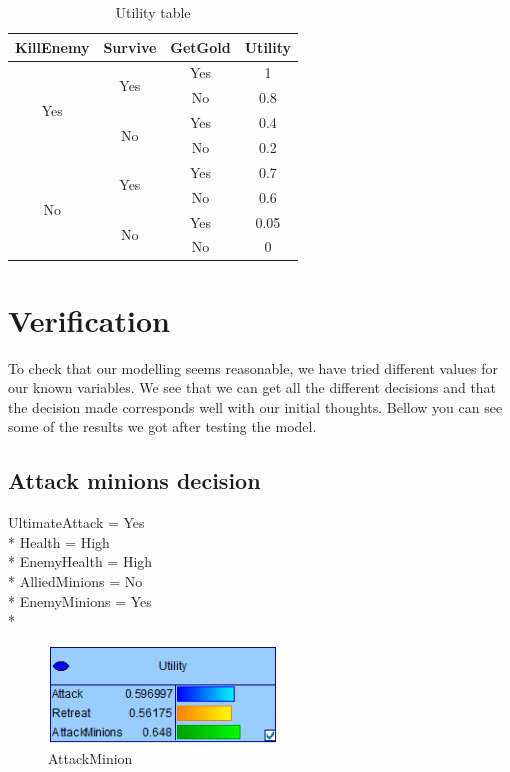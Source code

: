 \documentclass[titlepage]{article}
\begin{document}
\begin{table}[H]
\centering
\begin{tabular}{ |c|c|c|c| }

\hline
KillEnemy & Survive & GetGold & Utility \\ \hline
\multirow{4}{*}{Yes} & \multirow{2}{*}{Yes} & Yes & 1 \\ \cline{3-4}
 & & No & 0.8 \\ \cline{2-4}
 & \multirow{2}{*}{No} & Yes & 0.4 \\ \cline{3-4}
 & & No & 0.2 \\ \hline

 \multirow{4}{*}{No} & \multirow{2}{*}{Yes} & Yes & 0.7 \\ \cline{3-4}
 & & No & 0.6 \\ \cline{2-4}
 & \multirow{2}{*}{No} & Yes & 0.05 \\ \cline{3-4}
 & & No & 0 \\ \hline
\end{tabular}
\caption{Utility table}
\end{table}


\section{Verification}
To check that our modelling seems reasonable, we have tried different values for our known variables. We see that we can get all the different decisions and that the decision made corresponds well with our initial thoughts. Bellow you can see some of the results we got after testing the model.

\subsection*{Attack minions decision}
UltimateAttack = Yes \\*
Health = High \\*
EnemyHealth = High \\*
AlliedMinions = No \\*
EnemyMinions = Yes \\*

\begin{figure}[H] \centering
\includegraphics[width=230px]{atkMin.PNG}
\caption{AttackMinion}
\label{fig:atkMin}
\end{figure}
\end{document}
